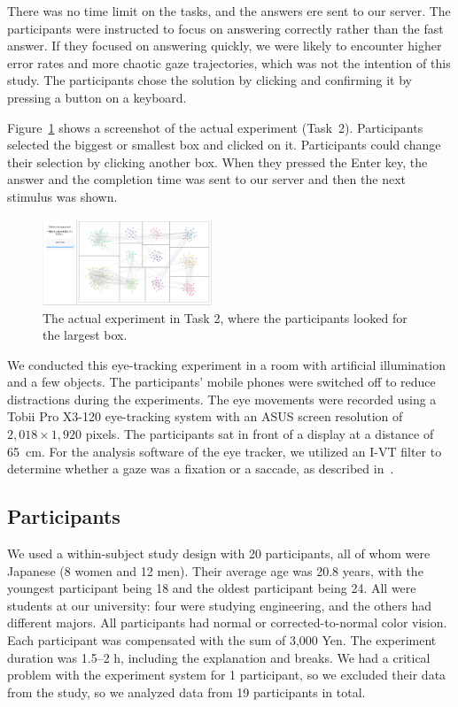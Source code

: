 \documentclass[review]{vgtc}                 %
\begin{document}
There was no time limit on the tasks, and the answers ere sent to our server.
The participants were instructed to focus on answering correctly rather than the fast answer.
If they focused on answering quickly, we were likely to encounter higher error rates and more chaotic gaze trajectories, which was not the intention of this study.
The participants chose the solution by clicking and confirming it by pressing a button on a keyboard.

Figure~\ref{screenShot} shows a screenshot of the actual experiment (Task~2). Participants selected the biggest or smallest box and clicked on it. Participants could change their selection by clicking another box. When they pressed the Enter key, the answer and the completion time was sent to our server and then the next stimulus was shown.

\begin{figure}[t]
  \begin{center}
    \includegraphics[width=0.45\textwidth]{pictures/screenshot.png}
    \caption{The actual experiment in Task 2, where the participants looked for the largest box.}
    \label{screenShot}
  \end{center}
\end{figure}

We conducted this eye-tracking experiment in a room with artificial illumination and a few objects.
The participants' mobile phones were switched off to reduce distractions during the experiments.
The eye movements were recorded using a Tobii Pro X3-120 eye-tracking system with an ASUS screen resolution of $2,018 \times 1,920$ pixels.
The participants sat in front of a display at a distance of 65~cm.
For the analysis software of the eye tracker, we utilized an I-VT filter to determine whether a gaze was a fixation or a saccade, as described in~\cite{olsen2012tobii}.

\subsection{Participants}

We used a within-subject study design with 20 participants, all of whom were Japanese (8 women and 12 men).
Their average age was 20.8 years, with the youngest participant being 18 and the oldest participant being 24.
All were students at our university: four were studying engineering, and the others had different majors.
All participants had normal or corrected-to-normal color vision.
Each participant was compensated with the sum of 3,000 Yen.
The experiment duration was 1.5--2 h, including the explanation and breaks.
We had a critical problem with the experiment system for 1 participant, so we excluded their data from the study, so we analyzed data from 19 participants in total.
\end{document}
